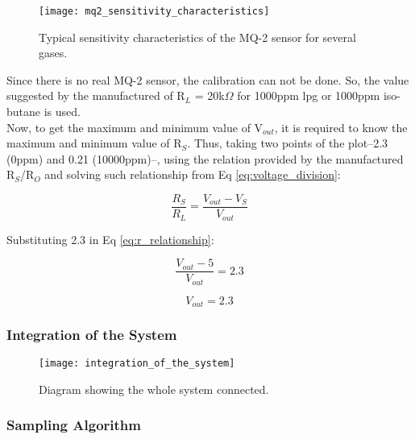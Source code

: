 \begin{figure}[ht]
    \centering\texttt{[image: mq2\_sensitivity\_characteristics]}
    \caption{Typical sensitivity characteristics of the MQ-2 sensor for several gases.}
    \label{fig:mq2_sensitivity_characteristics}
\end{figure}

Since there is no real MQ-2 sensor, the calibration can not be done. So, the value suggested by the manufactured of R$_{L}$ = 20k$\Omega$ for 1000ppm \acrshort{lpg} or 1000ppm iso-butane is used. \\

Now, to get the maximum and minimum value of V$_{out}$, it is required to know the maximum and minimum value of R$_{S}$. Thus, taking two points of the plot--2.3 (0ppm) and 0.21 (10000ppm)--, using the relation provided by the manufactured R$_{S}$/R$_{O}$ and solving such relationship from Eq \ref{eq:voltage_division}: 

\begin{equation}
    \frac{R_{S}}{R_{L}} = \frac{V_{out} - V_{S}}{V_{out}}
    \label{eq:r_relationship}
\end{equation}

Substituting 2.3 in Eq \ref{eq:r_relationship}:

\begin{equation}
    \frac{V_{out} - 5}{V_{out}} = 2.3
\end{equation}

\begin{equation}
    V_{out} = 2.3
\end{equation}

\subsubsection{Integration of the System}
\label{sec:methodology:dev_methodology:iots}
\hspace{8pt}



\begin{figure}[ht]
    \centering\texttt{[image: integration\_of\_the\_system]}
    \caption{Diagram showing the whole system connected.}
    \label{fig:integration_of_the_system}
\end{figure}


\subsubsection{Sampling Algorithm}
\label{sec:methodology:dev_methodology:sa}
\hspace{8pt}


